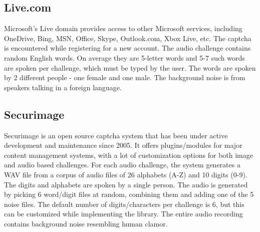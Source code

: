 %

\subsection{Live.com}

Microsoft's Live domain provides access to other Microsoft services, including
 OneDrive, Bing, MSN, Office, Skype, Outlook.com, Xbox Live, etc. The captcha is 
 encountered while registering for a new account. The audio challenge contains random English 
 words. On average they are 5-letter words and 5-7 such words are spoken per challenge, which must be typed by the user.
The words are spoken by 2 different people - one female and one male. The background noise 
is from speakers talking in a foreign language.

\subsection{Securimage}

Securimage is an open source captcha system that has been under active development and maintenance 
since 2005. It offers plugins/modules for major content management systems, with a lot of customization 
options for both image and audio based challenges. For each audio challenge, the system generates a WAV 
file from a corpus of audio files of 26 alphabets (A-Z) and 10 digits (0-9). The digits and alphabets are 
spoken by a single person. The audio is generated by picking 6 word/digit files at random, combining them and adding one 
of the 5 noise files. The default number of digits/characters per challenge is 6, but this can 
be customized while implementing the library. The entire audio recording contains background noise resembling
human clamor.

